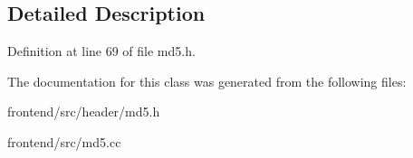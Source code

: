 \subsection{Detailed Description}


Definition at line 69 of file md5.\-h.



The documentation for this class was generated from the following files\-:\begin{DoxyCompactItemize}
\item 
frontend/src/header/md5.\-h\item 
frontend/src/md5.\-cc\end{DoxyCompactItemize}

